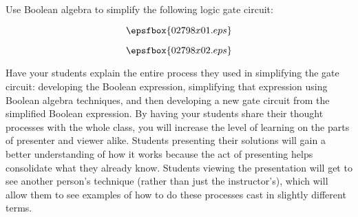 

Use Boolean algebra to simplify the following logic gate circuit:

$$\epsfbox{02798x01.eps}$$







$$\epsfbox{02798x02.eps}$$







Have your students explain the entire process they used in simplifying the gate circuit: developing the Boolean expression, simplifying that expression using Boolean algebra techniques, and then developing a new gate circuit from the simplified Boolean expression.  By having your students share their thought processes with the whole class, you will increase the level of learning on the parts of presenter and viewer alike.  Students presenting their solutions will gain a better understanding of how it works because the act of presenting helps consolidate what they already know.  Students viewing the presentation will get to see another person's technique (rather than just the instructor's), which will allow them to see examples of how to do these processes cast in slightly different terms.




